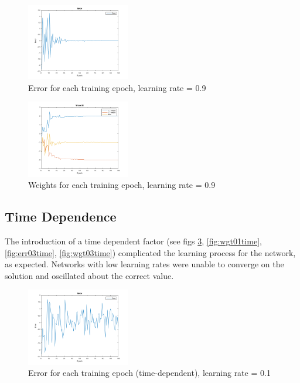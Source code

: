 \documentclass{IEEEtran}
\begin{document}
\begin{centering}
\begin{figure}
\begin{center}
	\includegraphics[width=0.4\textwidth]{error_notime_09lr}
	\caption{Error for each training epoch, learning rate = 0.9\label{fig:err09notime}}
\end{center}
\end{figure}
\end{centering}

\begin{centering}
\begin{figure}
\begin{center}
	\includegraphics[width=0.4\textwidth]{weights_notime_09lr}
	\caption{Weights for each training epoch, learning rate = 0.9\label{fig:wgt09notime}}
\end{center}
\end{figure}
\end{centering}

\subsection{Time Dependence}
The introduction of a time dependent factor (see figs \ref{fig:err01time}, \ref{fig:wgt01time}, \ref{fig:err03time}, \ref{fig:wgt03time}) complicated the learning process for the network, as expected. Networks with low learning rates were unable to converge on the solution and oscillated about the correct value.

\begin{centering}
\begin{figure}
\begin{center}
	\includegraphics[width=0.4\textwidth]{error_time_01lr}
	\caption{Error for each training epoch (time-dependent), learning rate = 0.1\label{fig:err01time}}
\end{center}
\end{figure}
\end{centering}
\end{document}
